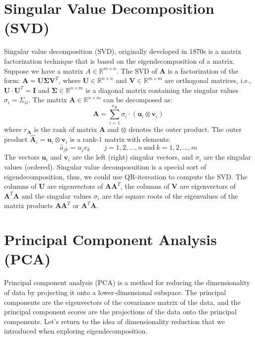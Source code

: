 \documentclass{article}[11pt]
\def\R{\mathbb{R}}
\begin{document}
\section{Singular Value Decomposition (SVD)}
Singular value decomposition (SVD), originally developed in 1870s \citep{Stewart:1993} is a matrix factorization technique that is based on the eigendecomposition of a matrix.
Suppose we have a matrix $A \in \R^{m \times n}$. The SVD of $\mathbf{A}$ is a factorization of the form: $\mathbf{A} = \mathbf{U}\mathbf{\Sigma}\mathbf{V}^{T}$, where
$\mathbf{U}\in\mathbb{R}^{n\times{n}}$ and $\mathbf{V}\in\mathbb{R}^{m\times{m}}$ are orthogonal matrices, i.e., $\mathbf{U}\cdot\mathbf{U}^{T} = \mathbf{I}$ and $\mathbf{\Sigma}\in\mathbb{R}^{n\times{m}}$ is a diagonal matrix containing 
the singular values $\sigma_{i}=\Sigma_{ii}$. The matrix $\mathbf{A}\in\mathbb{R}^{n\times{m}}$ can be decomposed as:
\begin{equation*}
\mathbf{A} = \sum_{i=1}^{r_{\mathbf{A}}}\sigma_{i}\cdot\left(\mathbf{u}_{i}\otimes\mathbf{v}_{i}\right)
\end{equation*}
where $r_{\mathbf{A}}$ is the rank of matrix $\mathbf{A}$ and $\otimes$ denotes the outer product. 
The outer product $\hat{\mathbf{A}}_{i} = \mathbf{u}_{i}\otimes\mathbf{v}_{i}$ is a rank-1 matrix with elements: 
\begin{equation*}
\hat{a}_{jk} = u_{j}v_{k}\qquad{j=1,2,\dots,n~\text{and}~k=1,2,\dots,m}
\end{equation*}
The vectors $\mathbf{u}_{i}$ and $\mathbf{v}_{i}$ are the left (right) singular vectors, 
and $\sigma_{i}$ are the singular values (ordered). Singular value decomposuition is a special sort of eigendecomposition, thus, we could use QR-itereation to compute the SVD.
The columns of $\mathbf{U}$ are eigenvectors of $\mathbf{A}\mathbf{A}^{T}$, 
the columns of $\mathbf{V}$ are eigenvectors of $\mathbf{A}^{T}\mathbf{A}$ and
the singular values $\sigma_{i}$ are the square roots of the eigenvalues of the matrix products $\mathbf{A}\mathbf{A}^{T}$ or $\mathbf{A}^{T}\mathbf{A}$. 

\section{Principal Component Analysis (PCA)}
Principal component analysis (PCA) is a method for reducing the dimensionality of data by projecting it onto a lower-dimensional subspace.
The principal components are the eigenvectors of the covariance matrix of the data, and the principal component scores are the projections of the data onto the principal components.
Let's return to the idea of dimensionality reduction that we introduced when exploring eigendecomposition.
\end{document}
